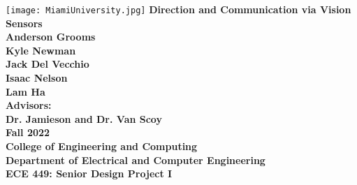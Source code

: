 \documentclass{report}
\begin{document}
\begin{titlepage}
    \centering
    \texttt{[image: MiamiUniversity.jpg]}
    \vskip0.5cm
    {\bfseries\Large
        Direction and Communication via Vision Sensors\\
        \vskip0.5cm
        Anderson Grooms\\
        Kyle Newman\\
        Jack Del Vecchio\\
        Isaac Nelson\\
        Lam Ha\\
        \vskip0.5cm
        Advisors:\\
        Dr. Jamieson and Dr. Van Scoy\\
        \vskip0.5cm
        Fall 2022\\
        College of Engineering and Computing\\
        Department of Electrical and Computer Engineering\\
        ECE 449: Senior Design Project I\\
    }    
    \vfill
    \vfill
\end{titlepage}
\end{document}
